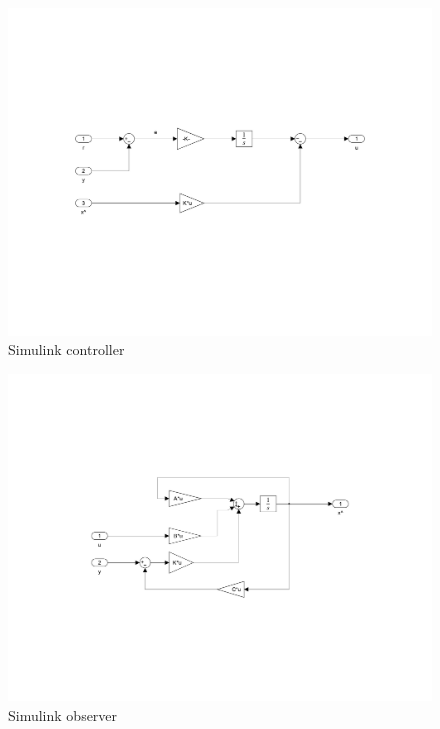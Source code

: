 \FloatBarrier
\begin{figure}[ht]
	\begin{center}
		\includegraphics[clip, trim=0cm 8cm 0cm 8cm, width=1\textwidth]{simulink/simulinkController.pdf}
		\caption[Simulink controller]{Simulink controller}
		\label{fig:simuController}
	\end{center}
\end{figure}
\FloatBarrier

\FloatBarrier
\begin{figure}[ht]
	\begin{center}
		\includegraphics[clip, trim=0cm 6.5cm 0cm 6cm, width=1\textwidth]{simulink/simulinkObserver.pdf}
		\caption[Simulink observer]{Simulink observer}
		\label{fig:simuObserver}
	\end{center}
\end{figure}
\FloatBarrier

